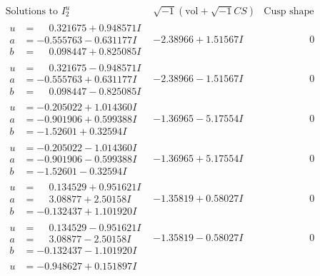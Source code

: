 \documentclass[1p]{elsarticle_modified}
\theoremstyle{definition}
\newcommand{\I}{\sqrt{-1}}
\begin{document}
$$\begin{array}{c|c|c}  
\text{Solutions to }I^u_{2}& \I (\text{vol} + \sqrt{-1}CS) & \text{Cusp shape}\\
 \hline 
\begin{aligned}
u &= \phantom{-}0.321675 + 0.948571 I \\
a &= -0.555763 - 0.631177 I \\
b &= \phantom{-}0.098447 + 0.825085 I\end{aligned}
 & -2.38966 + 1.51567 I & \phantom{-0.000000 } 0 \\ \hline\begin{aligned}
u &= \phantom{-}0.321675 - 0.948571 I \\
a &= -0.555763 + 0.631177 I \\
b &= \phantom{-}0.098447 - 0.825085 I\end{aligned}
 & -2.38966 - 1.51567 I & \phantom{-0.000000 } 0 \\ \hline\begin{aligned}
u &= -0.205022 + 1.014360 I \\
a &= -0.901906 + 0.599388 I \\
b &= -1.52601 + 0.32594 I\end{aligned}
 & -1.36965 - 5.17554 I & \phantom{-0.000000 } 0 \\ \hline\begin{aligned}
u &= -0.205022 - 1.014360 I \\
a &= -0.901906 - 0.599388 I \\
b &= -1.52601 - 0.32594 I\end{aligned}
 & -1.36965 + 5.17554 I & \phantom{-0.000000 } 0 \\ \hline\begin{aligned}
u &= \phantom{-}0.134529 + 0.951621 I \\
a &= \phantom{-}3.08877 + 2.50158 I \\
b &= -0.132437 + 1.101920 I\end{aligned}
 & -1.35819 + 0.58027 I & \phantom{-0.000000 } 0 \\ \hline\begin{aligned}
u &= \phantom{-}0.134529 - 0.951621 I \\
a &= \phantom{-}3.08877 - 2.50158 I \\
b &= -0.132437 - 1.101920 I\end{aligned}
 & -1.35819 - 0.58027 I & \phantom{-0.000000 } 0 \\ \hline\begin{aligned}
u &= -0.948627 + 0.151897 I \\

\end{aligned}
\end{array}$$
\end{document}
